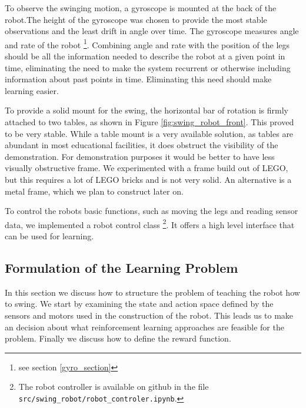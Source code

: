 \documentclass[11pt, a4paper]{article}
\begin{document}
	To observe the swinging motion, a gyroscope is mounted at the back of the robot.The height of the gyroscope was chosen to provide the most stable observations and the least drift in angle over time. The gyroscope measures angle and rate of the robot \footnote{see section \ref{gyro_section}}. Combining angle and rate with the position of the legs should be all the information needed to describe the robot at a given point in time, eliminating the need to make the system recurrent or otherwise including information about past points in time. Eliminating this need should make learning easier.
	
	To provide a solid mount for the swing, the horizontal bar of rotation is firmly attached to two tables, as shown in Figure \ref{fig:swing_robot_front}. This proved to be very stable. While a table mount is a very available solution, as tables are abundant in most educational facilities, it does obstruct the visibility of the demonstration. For demonstration purposes it would be better to have less visually obstructive frame. We experimented with a frame build out of LEGO, but this requires a lot of LEGO bricks and is not very solid. An alternative is a metal frame, which we plan to construct later on.
	
	To control the robots basic functions, such as moving the legs and reading sensor data, we implemented a robot control class \footnote{The robot controller is available on github in the file \texttt{src/swing\_robot/robot\_controler.ipynb}.}. It offers a high level interface that can be used for learning.
	
	\subsection{Formulation of the Learning Problem}
	In this section we discuss how to structure the problem of teaching the robot how to swing. We start by examining the state and action space defined by the sensors and motors used in the construction of the robot. This leads us to make an decision about what reinforcement learning approaches are feasible for the problem.  Finally we discuss how to define the reward function.
	
\end{document}
